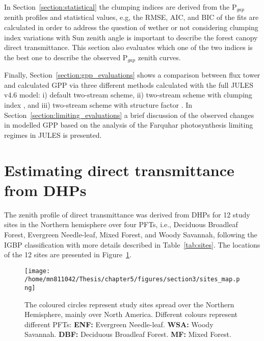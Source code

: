 \documentclass[a4paper,11pt]{report}
\begin{document}
In Section~\ref{section:statistical} the clumping indices are derived from the P$_{gap}$ zenith profiles and statistical values, e.g, the RMSE, AIC, and BIC of the fits are calculated in order to address the question of wether or not considering clumping index variations with Sun zenith angle is important to describe the forest canopy direct transmittance. This section also evaluates which one of the two indices is the best one to describe the observed P$_{gap}$ zenith curves.


Finally, Section~\ref{section:gpp_evaluations} shows a comparison between flux tower and calculated GPP via three different methods calculated with the full JULES v4.6 model: i) default two-stream scheme, ii) two-stream scheme with clumping index \citep{Nilson1971}, and iii) two-stream scheme with structure factor \citep{pinty2006}. In Section~\ref{section:limiting_evaluations} a brief discussion of the observed changes in modelled GPP based on the analysis of the Farquhar photosynthesis limiting regimes in JULES is presented.

\section{Estimating direct transmittance from DHPs}\label{section:hemiphotos}

The zenith profile of direct transmittance was derived from DHPs for 12 study sites in the Northern hemisphere over four PFTs, i.e., Deciduous Broadleaf Forest, Evergreen Needle-leaf, Mixed Forest, and Woody Savannah, following the IGBP classification \citep{Loveland1997} with more details described in Table~\ref{tab:sites}. The locations of the 12 sites are presented in Figure~\ref{f:studysites}.

\begin{figure}[ht!]
\centering
\texttt{[image: /home/mn811042/Thesis/chapter5/figures/section3/sites\_map.png]}
\caption{The coloured circles represent study sites spread over the Northern Hemisphere, mainly over North America. Different colours represent different PFTs: \textbf{ENF:} Evergreen Needle-leaf. \textbf{WSA:} Woody Savannah. \textbf{DBF:} Deciduous Broadleaf Forest. \textbf{MF:} Mixed Forest.} 
\label{f:studysites}
\end{figure}
\end{document}
